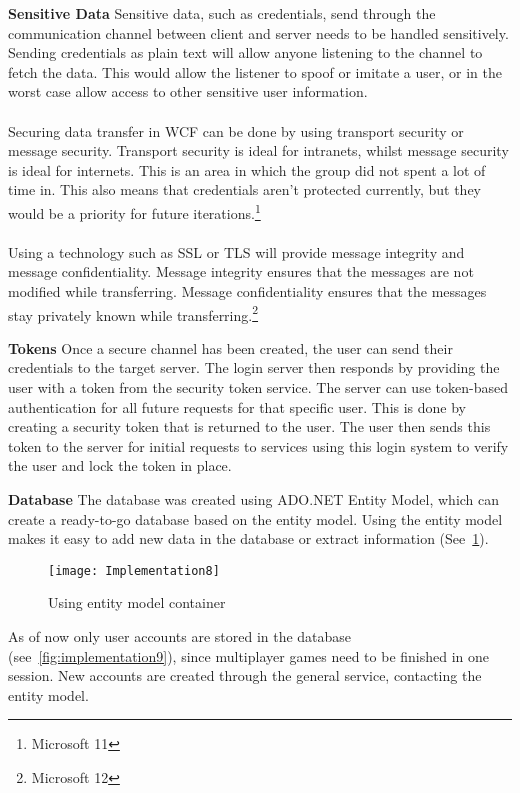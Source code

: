 \textbf {Sensitive Data}
Sensitive data, such as credentials, send through the communication
 channel between client and server needs to be handled sensitively.
  Sending credentials as plain text will allow anyone listening to
  the channel to fetch the data. This would allow the listener to
  spoof or imitate a user, or in the worst case allow access to
   other sensitive user information.
\\\\
Securing data transfer in WCF can be done by using transport
security or message security. Transport security is ideal for
 intranets, whilst message security is ideal for internets.
  This is an area in which the group did not spent a lot of time in.
   This also means that credentials aren’t protected currently,
    but they would be a priority for future iterations.\footnote{Microsoft 11}
\\\\
Using a technology such as SSL or TLS will provide message integrity
 and message confidentiality. Message integrity ensures that the messages
 are not modified while transferring. Message confidentiality ensures
  that the messages stay privately known while
  transferring.\footnote{Microsoft 12}

\textbf {Tokens}
Once a secure channel has been created, the user can send their
credentials to the target server. The login server then responds
 by providing the user with a token from the security token service.
 The server can use token-based authentication for all future requests
 for that specific user. This is done by creating a security token that
 is returned to the user. The user then sends this token to the server for
  initial requests to services using this login system to verify the user
   and lock the token in place.

\textbf {Database}
The database was created using ADO.NET Entity Model, which can create a
ready-to-go database based on the entity model. Using the entity model
 makes it easy to add new data in the database or extract
  information (See~\ref{fig:implementation8}).

\begin{figure}[h]
\centerline{\texttt{[image: Implementation8]}}
\caption {Using entity model container}
\label {fig:implementation8}
\end{figure}

As of now only user accounts are stored in the database
(see~\ref{fig:implementation9}), since multiplayer games need to be
 finished in one session. New accounts are created through the general
  service, contacting the entity model.

